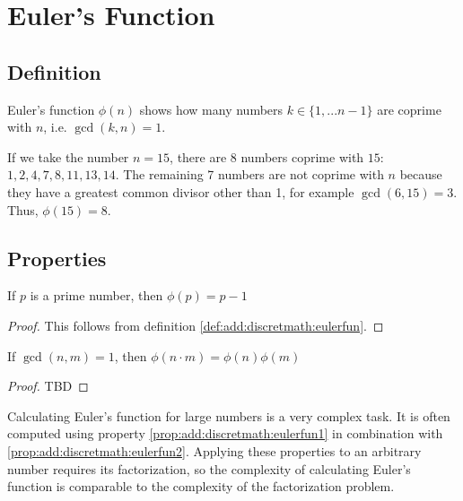 \section{Euler's Function}

\subsection{Definition}
\begin{definition}
Euler's function $\phi\left(n\right)$ shows how many numbers $k \in \{1, ... n-1\}$ are coprime with $n$, i.e. $\gcd\left(k, n\right) = 1$.
\label{def:add:discretmath:eulerfun}
\end{definition}

\begin{example}
  If we take the number $n=15$, there are 8 numbers coprime with $15$: $1, 2, 4, 7, 8, 11, 13, 14$. The remaining 7 numbers are not coprime with $n$ because they have a greatest common divisor other than 1, for example $\gcd\left(6, 15\right) = 3$. Thus, $\phi\left(15\right) = 8$. 
\end{example}

\subsection{Properties}

\begin{property}
If $p$ is a prime number, then $\phi(p) = p - 1$
\begin{proof}
This follows from definition \ref{def:add:discretmath:eulerfun}.
\end{proof}
\label{prop:add:discretmath:eulerfun1}
\end{property}

\begin{property}
If $\gcd\left(n, m\right) = 1$, then $\phi\left(n \cdot m\right) = \phi\left(n\right) \phi\left(m\right)$
\begin{proof}
TBD
\end{proof}
\label{prop:add:discretmath:eulerfun2}
\end{property}

\begin{remark}
\label{rem:add:discretmath:eulerfuncomplex}
Calculating Euler's function for large numbers is a very complex task. It is often computed using property \ref{prop:add:discretmath:eulerfun1} in combination with \ref{prop:add:discretmath:eulerfun2}. Applying these properties to an arbitrary number requires its factorization, so the complexity of calculating Euler's function is comparable to the complexity of the factorization problem.
\end{remark}